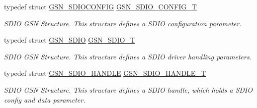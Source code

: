 \begin{DoxyCompactItemize}
typedef struct \hyperlink{a00226}{GSN\_\-SDIOCONFIG} \hyperlink{a00653_ga741fda4dc2cd93143a8a73ddaace7de8}{GSN\_\-SDIO\_\-CONFIG\_\-T}
\begin{DoxyCompactList}\small\item\em SDIO GSN Structure. This structure defines a SDIO configuration parameter. \end{DoxyCompactList}\item 
typedef struct \hyperlink{a00216}{GSN\_\-SDIO} \hyperlink{a00653_gadc47bf5efb9097e51608305810d29895}{GSN\_\-SDIO\_\-T}
\begin{DoxyCompactList}\small\item\em SDIO GSN Structure. This structure defines a SDIO driver handling parameters. \end{DoxyCompactList}\item 
typedef struct \hyperlink{a00224}{GSN\_\-SDIO\_\-HANDLE} \hyperlink{a00653_gaa50b5846f8905e5a7ab1cec63e6877a7}{GSN\_\-SDIO\_\-HANDLE\_\-T}
\begin{DoxyCompactList}\small\item\em SDIO GSN Structure. This structure defines a SDIO handle, which holds a SDIO config and data parameter. \end{DoxyCompactList}\end{DoxyCompactItemize}
